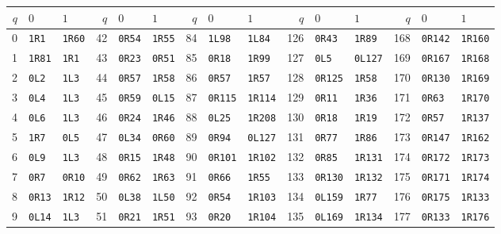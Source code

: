 \begin{center}
\scriptsize
\setlength{\tabcolsep}{4pt}
\begin{tabular}{rll@{\qquad}rll@{\qquad}rll@{\qquad}rll@{\qquad}rll}
\toprule
$q$ & $0$ & $1$ & $q$ & $0$ & $1$ & $q$ & $0$ & $1$ & $q$ & $0$ & $1$ & $q$ & $0$ & $1$ \\
\midrule
0 & \texttt{1R1} & \texttt{1R60} & 42 & \texttt{0R54} & \texttt{1R55} & 84 & \texttt{1L98} & \texttt{1L84} & 126 & \texttt{0R43} & \texttt{1R89} & 168 & \texttt{0R142} & \texttt{1R160} \\
1 & \texttt{1R81} & \texttt{1R1} & 43 & \texttt{0R23} & \texttt{0R51} & 85 & \texttt{0R18} & \texttt{1R99} & 127 & \texttt{0L5} & \texttt{0L127} & 169 & \texttt{0R167} & \texttt{1R168} \\
2 & \texttt{0L2} & \texttt{1L3} & 44 & \texttt{0R57} & \texttt{1R58} & 86 & \texttt{0R57} & \texttt{1R57} & 128 & \texttt{0R125} & \texttt{1R58} & 170 & \texttt{0R130} & \texttt{1R169} \\
3 & \texttt{0L4} & \texttt{1L3} & 45 & \texttt{0R59} & \texttt{0L15} & 87 & \texttt{0R115} & \texttt{1R114} & 129 & \texttt{0R11} & \texttt{1R36} & 171 & \texttt{0R63} & \texttt{1R170} \\
4 & \texttt{0L6} & \texttt{1L3} & 46 & \texttt{0R24} & \texttt{1R46} & 88 & \texttt{0L25} & \texttt{1R208} & 130 & \texttt{0R18} & \texttt{1R19} & 172 & \texttt{0R57} & \texttt{1R137} \\
5 & \texttt{1R7} & \texttt{0L5} & 47 & \texttt{0L34} & \texttt{0R60} & 89 & \texttt{0R94} & \texttt{0L127} & 131 & \texttt{0R77} & \texttt{1R86} & 173 & \texttt{0R147} & \texttt{1R162} \\
6 & \texttt{0L9} & \texttt{1L3} & 48 & \texttt{0R15} & \texttt{1R48} & 90 & \texttt{0R101} & \texttt{1R102} & 132 & \texttt{0R85} & \texttt{1R131} & 174 & \texttt{0R172} & \texttt{1R173} \\
7 & \texttt{0R7} & \texttt{0R10} & 49 & \texttt{0R62} & \texttt{1R63} & 91 & \texttt{0R66} & \texttt{1R55} & 133 & \texttt{0R130} & \texttt{1R132} & 175 & \texttt{0R171} & \texttt{1R174} \\
8 & \texttt{0R13} & \texttt{1R12} & 50 & \texttt{0L38} & \texttt{1L50} & 92 & \texttt{0R54} & \texttt{1R103} & 134 & \texttt{0L159} & \texttt{1R77} & 176 & \texttt{0R175} & \texttt{1R133} \\
9 & \texttt{0L14} & \texttt{1L3} & 51 & \texttt{0R21} & \texttt{1R51} & 93 & \texttt{0R20} & \texttt{1R104} & 135 & \texttt{0L169} & \texttt{1R134} & 177 & \texttt{0R133} & \texttt{1R176} \\

\end{tabular}
\end{center}
